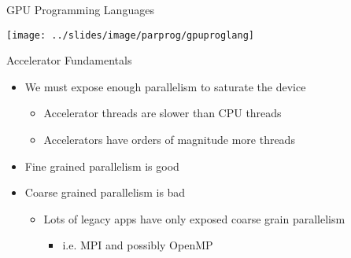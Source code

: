 \documentclass[10pt,t]{beamer}
\begin{document}
\begin{frame}{GPU Programming Languages}
  \begin{center}
    \texttt{[image: ../slides/image/parprog/gpuproglang]}
  \end{center}
\end{frame}

\begin{frame}{Accelerator Fundamentals}
  \begin{itemize}
    \item We must expose enough parallelism to saturate the device
      \begin{itemize}
        \item Accelerator threads are slower than CPU threads
        \item Accelerators have orders of magnitude more threads
      \end{itemize}
    \item Fine grained parallelism is good
    \item Coarse grained parallelism is bad
      \begin{itemize}
        \item Lots of legacy apps have only exposed coarse grain parallelism
          \begin{itemize}
            \item i.e. MPI and possibly OpenMP
          \end{itemize}
      \end{itemize}
  \end{itemize}
\end{frame}
\end{document}
